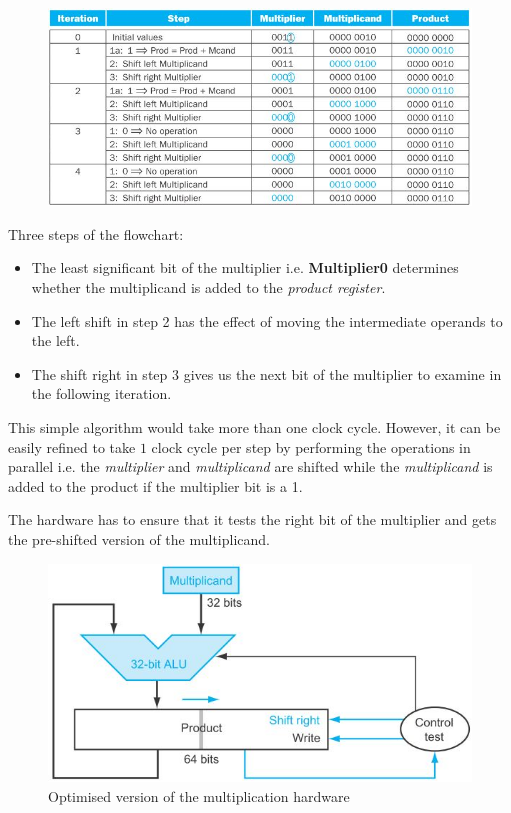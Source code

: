 \documentclass[10pt,a4paper]{article}
\begin{document}
\begin{figure} [h!]
    \centering
    \includegraphics[scale=0.75]{Multiply Example.JPG}
\end{figure}

Three steps of the flowchart:
\begin{itemize}
    \item  The least significant bit of the multiplier i.e. \textbf{Multiplier0} determines whether the multiplicand is added to the \textit{product register}.
    \item The left shift in step 2 has the effect of moving the intermediate operands to the left.
    \item The shift right in step 3 gives us the next bit of the multiplier to examine in the following iteration.
\end{itemize}

This simple algorithm would take more than one clock cycle. However, it can be easily refined to
take $1$ clock cycle per step by performing the operations in parallel i.e. the \textit{multiplier}
and \textit{multiplicand} are shifted while the \textit{multiplicand} is added to the product if the
multiplier bit is a 1.

The hardware has to ensure that it tests the right bit of the multiplier and gets the pre-shifted
version of the multiplicand.
\begin{figure} [h!]
    \centering
    \includegraphics[scale=0.7]{Multiply path 2.JPG}
    \caption{Optimised version of the multiplication hardware}
\end{figure}
\end{document}
